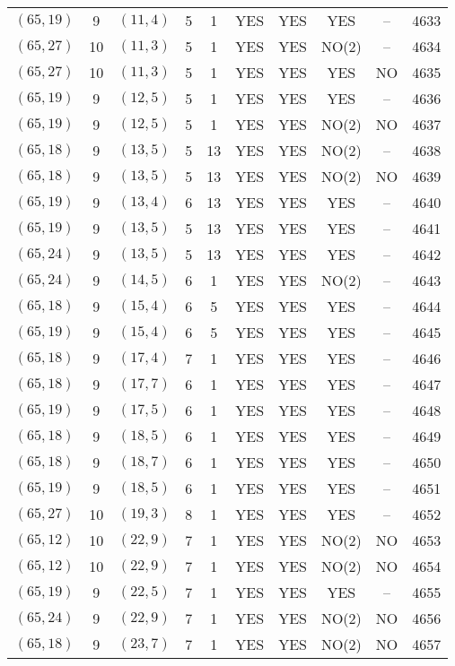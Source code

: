 \begin{longtable}{|c|c|c|c|c|c|c|c|c|c|}
$(65, 19)$ & 9 & $(11, 4)$ & 5 & 1 & YES & YES & YES & -- & 4633\\
$(65, 27)$ & 10 & $(11, 3)$ & 5 & 1 & YES & YES & NO(2) & -- & 4634\\
$(65, 27)$ & 10 & $(11, 3)$ & 5 & 1 & YES & YES & YES & NO & 4635\\
$(65, 19)$ & 9 & $(12, 5)$ & 5 & 1 & YES & YES & YES & -- & 4636\\
$(65, 19)$ & 9 & $(12, 5)$ & 5 & 1 & YES & YES & NO(2) & NO & 4637\\
$(65, 18)$ & 9 & $(13, 5)$ & 5 & 13 & YES & YES & NO(2) & -- & 4638\\
$(65, 18)$ & 9 & $(13, 5)$ & 5 & 13 & YES & YES & NO(2) & NO & 4639\\
$(65, 19)$ & 9 & $(13, 4)$ & 6 & 13 & YES & YES & YES & -- & 4640\\
$(65, 19)$ & 9 & $(13, 5)$ & 5 & 13 & YES & YES & YES & -- & 4641\\
$(65, 24)$ & 9 & $(13, 5)$ & 5 & 13 & YES & YES & YES & -- & 4642\\
$(65, 24)$ & 9 & $(14, 5)$ & 6 & 1 & YES & YES & NO(2) & -- & 4643\\
$(65, 18)$ & 9 & $(15, 4)$ & 6 & 5 & YES & YES & YES & -- & 4644\\
$(65, 19)$ & 9 & $(15, 4)$ & 6 & 5 & YES & YES & YES & -- & 4645\\
$(65, 18)$ & 9 & $(17, 4)$ & 7 & 1 & YES & YES & YES & -- & 4646\\
$(65, 18)$ & 9 & $(17, 7)$ & 6 & 1 & YES & YES & YES & -- & 4647\\
$(65, 19)$ & 9 & $(17, 5)$ & 6 & 1 & YES & YES & YES & -- & 4648\\
$(65, 18)$ & 9 & $(18, 5)$ & 6 & 1 & YES & YES & YES & -- & 4649\\
$(65, 18)$ & 9 & $(18, 7)$ & 6 & 1 & YES & YES & YES & -- & 4650\\
$(65, 19)$ & 9 & $(18, 5)$ & 6 & 1 & YES & YES & YES & -- & 4651\\
$(65, 27)$ & 10 & $(19, 3)$ & 8 & 1 & YES & YES & YES & -- & 4652\\
$(65, 12)$ & 10 & $(22, 9)$ & 7 & 1 & YES & YES & NO(2) & NO & 4653\\
$(65, 12)$ & 10 & $(22, 9)$ & 7 & 1 & YES & YES & NO(2) & NO & 4654\\
$(65, 19)$ & 9 & $(22, 5)$ & 7 & 1 & YES & YES & YES & -- & 4655\\
$(65, 24)$ & 9 & $(22, 9)$ & 7 & 1 & YES & YES & NO(2) & NO & 4656\\
$(65, 18)$ & 9 & $(23, 7)$ & 7 & 1 & YES & YES & NO(2) & NO & 4657\\

\end{longtable}
